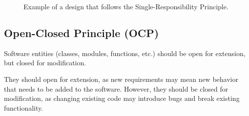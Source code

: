 \begin{figure}
    \centering
    \caption{Example of a design that follows the Single-Responsibility Principle.}
    \label{fig:employee-srp}
\end{figure}


\subsection{Open-Closed Principle (OCP)}

\begin{principio}
    Software entities (classes, modules, functions, etc.) should be open for extension, but closed for modification.
\end{principio}

They should open for extension, as new requirements may mean new behavior that needs to be added to the software. However, they should be closed for modification, as changing existing code may introduce bugs and break existing functionality.


